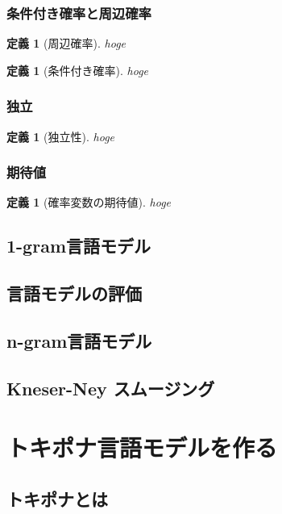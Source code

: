 \documentclass[11pt]{report}
\newtheorem{definition}[theorem]{定義}
\begin{document}
\subsection{条件付き確率と周辺確率}

\begin{definition}[周辺確率]
	hoge
\end{definition}

\begin{definition}[条件付き確率]
	hoge
\end{definition}

\subsection{独立}

\begin{definition}[独立性]
	hoge
\end{definition}

\subsection{期待値}

\begin{definition}[確率変数の期待値]
	hoge
\end{definition}

\section{1-gram言語モデル}

\section{言語モデルの評価}

\section{n-gram言語モデル}

\section{Kneser-Ney スムージング}

\chapter{トキポナ言語モデルを作る}

\section{トキポナとは}
\end{document}
